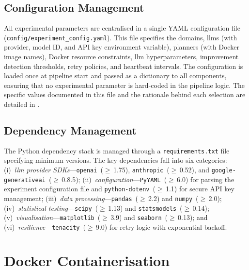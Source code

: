 \subsection{Configuration Management}
\label{sec:impl:codebase:config}

All experimental parameters are centralised in a single YAML configuration file (\texttt{config/\allowbreak experiment\_config.yaml}).
This file specifies the domains, \glspl{llm} (with provider, model ID, and API key environment variable), planners (with Docker image names), Docker resource constraints, \gls{llm} hyperparameters, improvement detection thresholds, retry policies, and heartbeat intervals.
The configuration is loaded once at pipeline start and passed as a dictionary to all components, ensuring that no experimental parameter is hard-coded in the pipeline logic.
The specific values documented in this file and the rationale behind each selection are detailed in .

\subsection{Dependency Management}
\label{sec:impl:codebase:deps}

The Python dependency stack is managed through a \texttt{requirements.txt} file specifying minimum versions.
The key dependencies fall into six categories:
(i)~\emph{\gls{llm} provider SDKs}---\texttt{openai}~($\geq$\,1.75), \texttt{anthropic}~($\geq$\,0.52), and \texttt{google-generativeai}~($\geq$\,0.8.5);
(ii)~\emph{configuration}---\texttt{PyYAML}~($\geq$\,6.0) for parsing the experiment configuration file and \texttt{python-dotenv}~($\geq$\,1.1) for secure API key management;
(iii)~\emph{data processing}---\texttt{pandas}~($\geq$\,2.2) and \texttt{numpy}~($\geq$\,2.0);
(iv)~\emph{statistical testing}---\texttt{scipy}~($\geq$\,1.13) and \texttt{statsmodels}~($\geq$\,0.14);
(v)~\emph{visualisation}---\texttt{matplotlib}~($\geq$\,3.9) and \texttt{seaborn}~($\geq$\,0.13);
and (vi)~\emph{resilience}---\texttt{tenacity}~($\geq$\,9.0) for retry logic with exponential backoff.


\section{Docker Containerisation}
\label{sec:impl:docker}

